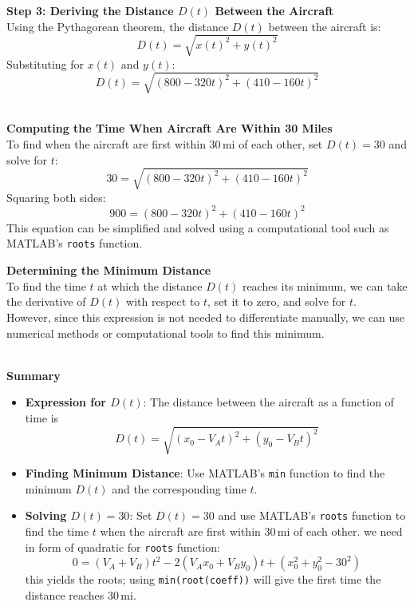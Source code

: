 \documentclass[a4paper, 12pt]{report}
\begin{document}
    \textbf{Step 3: Deriving the Distance \( D(t) \) Between the Aircraft}\\[1em]
    Using the Pythagorean theorem, the distance \( D(t) \) between the aircraft is:
    \[D(t) = \sqrt{x(t)^2 + y(t)^2}\]
    Substituting for \( x(t) \) and \( y(t) \):
    \[D(t) = \sqrt{(800 - 320t)^2 + (410 - 160t)^2}\]\\
    \vspace{1em}
    \begin{minipage}{0.45\textwidth}\centering
        \textbf{Computing the Time When Aircraft Are Within 30 Miles}\\[1em]
        To find when the aircraft are first within \( 30 \, \text{mi} \) of each other, set \( D(t) = 30 \) and solve for \( t \):
        \[30 = \sqrt{(800 - 320t)^2 + (410 - 160t)^2}\]
        Squaring both sides:
        \[900 = (800 - 320t)^2 + (410 - 160t)^2\]
        This equation can be simplified and solved using a computational tool such as MATLAB’s \texttt{roots} function.
    \end{minipage}\hfil
    \begin{minipage}{0.44\textwidth}\centering
        \textbf{Determining the Minimum Distance}\\[1em]
        To find the time \( t \) at which the distance \( D(t) \) reaches its minimum, we can take the derivative of \( D(t) \) with respect to \( t \), set it to zero, and solve for \( t \).\\[1em]
        However, since this expression is not needed to differentiate manually, we can use numerical methods or computational tools to find this minimum.\\[1em]
    \end{minipage}\\[2em]
    
    \textbf{Summary}
    \begin{itemize}[itemsep=-0.1cm]
        \item \textbf{Expression for \( D(t) \)}: The distance between the aircraft as a function of time is
        \[D(t) = \sqrt{(x_0 - V_A t)^2 + (y_0 - V_B t)^2}\]
        \item \textbf{Finding Minimum Distance}: Use MATLAB’s \texttt{min} function to find the minimum \( D(t) \) and the corresponding time \( t \).
        \item \textbf{Solving \( D(t) = 30 \)}: Set \( D(t) = 30 \) and use MATLAB’s \texttt{roots} function to find the time \( t \) when the aircraft are first within \( 30 \, \text{mi} \) of each other. we need in form of quadratic for \texttt{roots} function:
        \[0 = (V_A + V_B)t^2 - 2(V_A x_0 + V_B y_0)t + (x_0^2 + y_0^2 - 30^2)\]
        this yields the roots; using \texttt{min(root(coeff))} will give the first time the distance reaches \( 30 \, \text{mi} \).
    \end{itemize}
\end{document}
